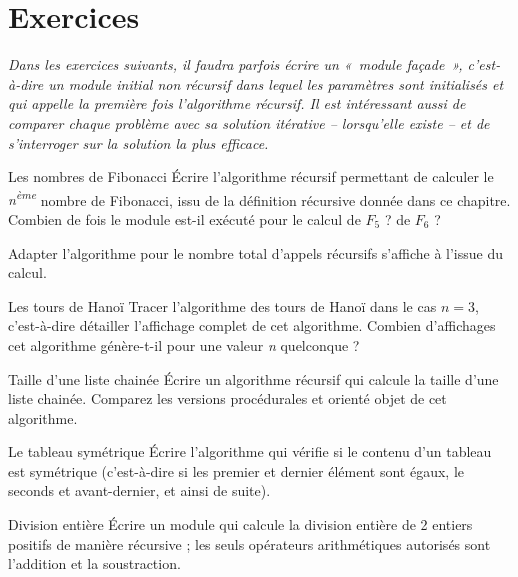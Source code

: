 \section{Exercices}

	{\itshape
	Dans les exercices suivants, il faudra parfois écrire un 
	«~module façade~», c'est-à-dire un module initial non récursif
	dans lequel les paramètres sont initialisés et qui appelle 
	la première fois l'algorithme récursif. Il est intéressant
	aussi de comparer chaque problème avec sa solution itérative 
	-- lorsqu'elle existe -- et de s'interroger sur la
	solution la plus efficace.}

	\begin{Exercice}{Les nombres de Fibonacci}
		Écrire l'algorithme récursif permettant de calculer le 
		\textit{n\textsuperscript{ème}} nombre de Fibonacci, 
		issu de la définition récursive donnée dans ce chapitre. 
		Combien de fois le module est-il exécuté pour le calcul de
		$F_5$ ? de $F_6$ ?

		Adapter l'algorithme pour le nombre total d'appels récursifs 
		s'affiche à l'issue du calcul.

	\end{Exercice}
	
	\begin{Exercice}{Les tours de Hanoï}
		Tracer l'algorithme des tours de Hanoï dans le cas 
		$n = 3$, c'est-à-dire détailler l'affichage complet de cet
		algorithme. Combien d'affichages cet algorithme génère-t-il 
		pour une valeur \textit{n} quelconque ?
	\end{Exercice}
	
	\begin{Exercice}{Taille d'une liste chainée}
		Écrire un algorithme récursif qui calcule la taille d'une liste 
		chainée. Comparez les versions procédurales et orienté
		objet de cet algorithme.
	\end{Exercice}
	
	\begin{Exercice}{Le tableau symétrique}
		Écrire l'algorithme qui vérifie si le contenu d'un tableau 
		est symétrique (c'est-à-dire si les premier et dernier
		élément sont égaux, le seconds et avant-dernier, et ainsi de suite).
	\end{Exercice}

	\begin{Exercice}{Division entière}
		Écrire un module qui calcule la division entière de 2 entiers 
		positifs de manière récursive ; les seuls opérateurs
		arithmétiques autorisés sont l'addition et la soustraction.
	\end{Exercice}

